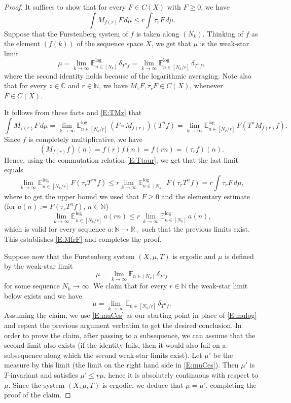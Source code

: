 \documentclass[11pt]{amsart}
\theoremstyle{definition}
\newcommand{\lE}{\mathbb{E}^{\log}}
\newcommand{\C}{{\mathbb C}}
\newcommand{\E}{{\mathbb E}}
\newcommand{\N}{{\mathbb N}}
\newcommand{\R}{{\mathbb R}}
\begin{document}
\begin{proof}
 It suffices to show that  for every $F\in C(X)$ with $F\geq 0$, we have
\begin{equation}\label{E:MfrF}
\int M_{f(r)} F\, d\mu\leq r\int \tau_rF\, d\mu.
\end{equation}
Suppose that the Furstenberg system of $f$ is taken along $(N_k)$.
 Thinking  of $f$ as the element $(f(k))$ of the sequence space $X$, we get that  $\mu$ is the  weak-star limit
\begin{equation}\label{E:mulog}
\mu=\lim_{k\to\infty} \lE_{n\in [N_k]} \, \delta_{T^n f}=\lim_{k\to\infty} \lE_{n\in [N_k/r]} \, \delta_{T^n f},
\end{equation}
where the second identity holds  because of the logarithmic averaging.
Note also that for every $z\in \C$ and $r\in \N$, we have $M_zF,\tau_rF\in C(X)$, whenever $F\in C(X)$.

 It follows from these facts  and   \eqref{E:TMz} that
$$
\int M_{f(r)} F\, d\mu=\lim_{k\to\infty} \lE_{n\in [N_k/r]} \, (F\circ M_{f(r)})(T^{n}f)=
\lim_{k\to\infty} \lE_{n\in [N_k/r]} \, F( T^{n}M_{f(r)}f).
$$
Since
$f$ is completely multiplicative, we have
\begin{equation}\label{komut}
(M_{f(r)}f)(n)=f(r)f(n)=f(rn)=(\tau_rf)(n).
\end{equation}
Hence, using the commutation relation \eqref{E:Ttaur}, we get that the last limit equals
$$
\lim_{k\to\infty} \lE_{n\in [N_k/r]} \, F( \tau_rT^{rn}f)\leq r \lim_{k\to\infty} \lE_{n\in [N_k]} \, F( \tau_rT^{n}f)= r\int \tau_rF\, d\mu,
$$
where to get the upper bound we used that $F\geq 0$ and the elementary estimate (for $a(n):=F( \tau_rT^{n}f)$, $n\in\N$)
$$
\lim_{k\to\infty} \lE_{n\in [N_k/r]}\,  a(rn)\leq r\, \lim_{k\to\infty} \lE_{n\in [N_k]} \, a(n),
$$
which  is valid for every  sequence $a\colon \N\to \R_+$ such that  the previous limits exist. This  establishes \eqref{E:MfrF} and completes the proof.

Suppose now that the Furstenberg system $(X,\mu,T)$ is ergodic and $\mu$ is defined by the weak-star limit 
$$
\mu=\lim_{k\to\infty} \E_{n\in [N_k]} \, \delta_{T^n f}
$$
for some sequence $N_k\to\infty$.  We claim that for every $r\in \N$ the weak-star limit below exists and we  have
 \begin{equation}\label{E:muCes}
\mu=\lim_{k\to\infty} \E_{n\in [N_k/r]} \, \delta_{T^n f}.
\end{equation}
Assuming the claim, we use \eqref{E:muCes} as our starting point in place of \eqref{E:mulog} and repeat the previous argument verbatim to get the desired conclusion.
In order to prove the claim, after passing to a subsequence, we can assume that the second limit also  exists (if the identity fails, then it would also fail on a subsequence along which the second weak-star limits exist). Let
$\mu'$ be the  measure by this limit (the limit on the right hand side in \eqref{E:muCes}). Then $\mu'$ is $T$-invariant and satisfies $\mu'\leq  r\mu$, hence it is absolutely continuous with respect to $\mu$.
Since the system $(X,\mu,T)$ is ergodic, we deduce that $\mu=\mu'$, completing the proof of the claim.
	\end{proof}
\end{document}
